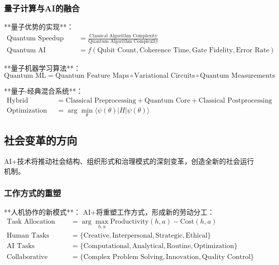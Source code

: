 \subsubsection{量子计算与AI的融合} %

**量子优势的实现**：
\begin{align}
\text{Quantum Speedup} &= \frac{\text{Classical Algorithm Complexity}}{\text{Quantum Algorithm Complexity}} \\
\text{Quantum AI Performance} &= f(\text{Qubit Count}, \text{Coherence Time}, \text{Gate Fidelity}, \text{Error Rate})
\end{align}

**量子机器学习算法**：
\begin{equation}
\text{Quantum ML} = \text{Quantum Feature Maps} \circ \text{Variational Circuits} \circ \text{Quantum Measurements}
\end{equation}

**量子-经典混合系统**：
\begin{align}
\text{Hybrid System} &= \text{Classical Preprocessing} + \text{Quantum Core} + \text{Classical Postprocessing} \\
\text{Optimization} &= \arg\min_{\theta} \langle \psi(\theta) | H | \psi(\theta) \rangle
\end{align}

\subsection{社会变革的方向}

AI+技术将推动社会结构、组织形式和治理模式的深刻变革，创造全新的社会运行机制。

\subsubsection{工作方式的重塑} %

**人机协作的新模式**：
AI+将重塑工作方式，形成新的劳动分工：
\begin{align}
\text{Task Allocation} &= \arg\max_{h,a} \text{Productivity}(h,a) - \text{Cost}(h,a) \\
\text{Human Tasks} &= \{\text{Creative}, \text{Interpersonal}, \text{Strategic}, \text{Ethical}\} \\
\text{AI Tasks} &= \{\text{Computational}, \text{Analytical}, \text{Routine}, \text{Optimization}\} \\
\text{Collaborative Tasks} &= \{\text{Complex Problem Solving}, \text{Innovation}, \text{Quality Control}\}
\end{align}

